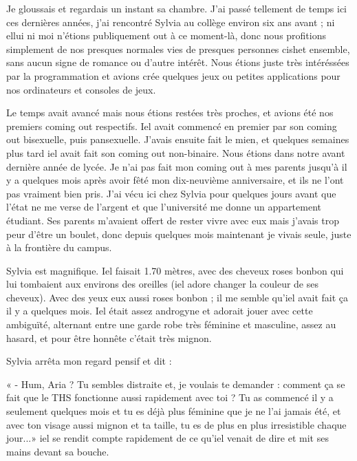 \documentclass[12pt,colorlinks,a4paper]{book}
\renewcommand{\cdot}{\textperiodcentered}
\begin{document}
\bigskip

Je gloussais et regardais un instant sa chambre. J'ai passé tellement
de temps ici ces dernières années, j'ai rencontré Sylvia au collège
environ six ans avant ; ni ellui ni moi n'étions publiquement out
à ce moment-là, donc nous profitions simplement de nos presques normales
vies de presques personnes cishet ensemble, sans aucun signe de romance
ou d'autre intérêt. Nous étions juste très intéréssé\cdot es par la programmation
et avions crée quelques jeux ou petites applications pour nos ordinateurs
et consoles de jeux.

\bigskip

Le temps avait avancé mais nous étions resté\cdot es très proches, et avions
été nos premiers coming out respectifs. Iel avait commencé en premier
par son coming out bisexuel\cdot le, puis pansexuel\cdot le. J'avais ensuite
fait le mien, et quelques semaines plus tard iel avait fait son coming
out non-binaire. Nous étions dans notre avant dernière année de lycée.
Je n'ai pas fait mon coming out à mes parents jusqu'à il y a quelques
mois après avoir fêté mon dix-neuvième anniversaire, et ils ne l'ont
pas vraiment bien pris. J'ai vécu ici chez Sylvia pour quelques jours
avant que l'état ne me verse de l'argent et que l'université me donne
un appartement étudiant. Ses parents m'avaient offert de rester vivre
avec eux mais j'avais trop peur d'être un boulet, donc depuis quelques
mois maintenant je vivais seule, juste à la frontière du campus.

\bigskip

Sylvia est magnifique. Iel faisait 1.70 mètres, avec des cheveux roses
bonbon qui lui tombaient aux environs des oreilles (iel adore changer
la couleur de ses cheveux). Avec des yeux eux aussi roses bonbon ;
il me semble qu'iel avait fait ça il y a quelques mois. Iel était
assez androgyne et adorait jouer avec cette ambiguïté, alternant entre
une garde robe très féminine et masculine, assez au hasard, et pour
être honnête c'était très mignon.

\bigskip

Sylvia arrêta mon regard pensif et dit :

« - Hum, Aria ? Tu sembles distraite et, je voulais te demander :
comment ça se fait que le THS fonctionne aussi rapidement avec toi
? Tu as commencé il y a seulement quelques mois et tu es déjà plus
féminine que je ne l'ai jamais été, et avec ton visage aussi mignon
et ta taille, tu es de plus en plus irresistible chaque jour...»
iel se rendit compte rapidement de ce qu'iel venait de dire et mit
ses mains devant sa bouche.
\end{document}
